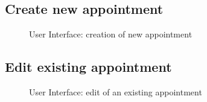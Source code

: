 \subsection{Create new appointment}
\label{subsec:newAppointment}
\begin{figure}[!h]
	\centering
	\caption{User Interface: creation of new appointment}
\end{figure}
\clearpage

\subsection{Edit existing appointment}
\label{subsec:editAppointment}
\begin{figure}[!h]
	\centering
	\caption{User Interface: edit of an existing appointment}
\end{figure}
\clearpage

